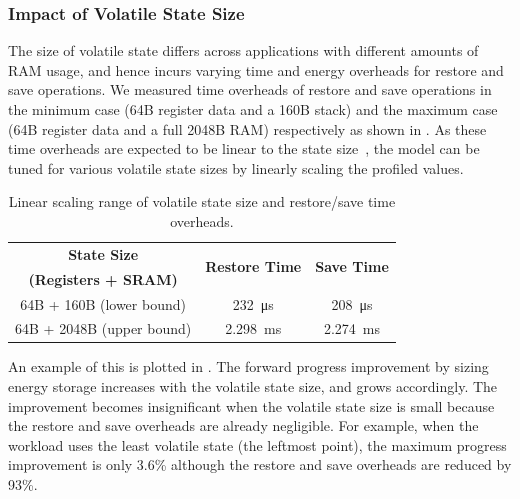 \subsubsection{Impact of Volatile State Size}

The size of volatile state differs across applications with different amounts of RAM usage, and hence incurs varying time and energy overheads for restore and save operations. 
We measured time overheads of restore and save operations in the minimum case (64B register data and a 160B stack) and the maximum case (64B register data and a full 2048B RAM) respectively as shown in . 
As these time overheads are expected to be linear to the state size~\cite{sliper2019efficient}, the model can be tuned for various volatile state sizes by linearly scaling the profiled values. 

\begin{table}
    \renewcommand{\arraystretch}{1.2}
    \centering
    \begin{tabular}{|c|cc|}
        \hline
        \textbf{State Size} & \multirow{2}{*}{\textbf{Restore Time}} & \multirow{2}{*}{\textbf{Save Time}}\\
        \textbf{(Registers + SRAM)} & & \\
        \hline
        64B + 160B (lower bound) & \SI{232}{\micro\second} & \SI{208}{\micro\second}\\
        64B + 2048B (upper bound) & \SI{2.298}{\milli\second} & \SI{2.274}{\milli\second} \\
        \hline
    \end{tabular}
    \caption{Linear scaling range of volatile state size and restore/save time overheads.}
    \label{tab:ramscale}
\end{table}

An example of this is plotted in . 
The forward progress improvement by sizing energy storage increases with the volatile state size, and  grows accordingly. 
The improvement becomes insignificant when the volatile state size is small because the restore and save overheads are already negligible. 
For example, when the workload uses the least volatile state (the leftmost point), the maximum progress improvement is only 3.6\% although the restore and save overheads are reduced by 93\%. 

